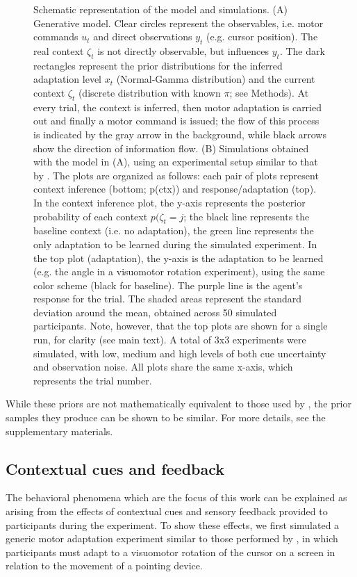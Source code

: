 \documentclass[a4paper,doc,floatsintext,natbib]{apa6}%
\begin{document}
\begin{figure}
\caption{Schematic representation of the model and simulations. (A) Generative model. Clear circles represent the observables, i.e. motor commands $u_t$ and direct observations $y_t$ (e.g. cursor position). The real context $\zeta_t$ is not directly observable, but influences $y_t$. The dark rectangles represent the prior distributions for the inferred adaptation level $x_t$ (Normal-Gamma distribution) and the current context $\zeta_t$ (discrete distribution with known $\pi$; see Methods). At every trial, the context is inferred, then motor adaptation is carried out and finally a motor command is issued; the flow of this process is indicated by the gray arrow in the background, while black arrows show the direction of information flow. (B) Simulations obtained with the model in (A), using an experimental setup similar to that by \cite{Davidson_Scaling_2004}. The plots are organized as follows: each pair of plots represent context inference (bottom; p(ctx)) and response/adaptation (top). In the context inference plot, the y-axis represents the posterior probability of each context $p(\zeta_t = j$; the black line represents the baseline context (i.e. no adaptation), the green line represents the only adaptation to be learned during the simulated experiment. In the top plot (adaptation), the y-axis is the adaptation to be learned (e.g. the angle in a visuomotor rotation experiment), using the same color scheme (black for baseline). The purple line is the agent's response for the trial. The shaded areas represent the standard deviation around the mean, obtained across 50 simulated participants. Note, however, that the top plots are shown for a single run, for clarity (see main text). A total of 3x3 experiments were simulated, with low, medium and high levels of both cue uncertainty and observation noise. All plots share the same x-axis, which represents the trial number.}
\label{fig:model}
\end{figure}
While these priors are not mathematically equivalent to those used by \cite{Heald_Contextual_2021}, the prior samples they produce can be shown to be similar. For more details, see the supplementary materials. 

\subsection{Contextual cues and feedback}
The behavioral phenomena which are the focus of this work can be explained as arising from the effects of contextual cues and sensory feedback provided to participants during the experiment. To show these effects, we first simulated a generic motor adaptation experiment similar to those performed by \cite{Davidson_Scaling_2004}, in which participants must adapt to a visuomotor rotation of the cursor on a screen in relation to the movement of a pointing device.
\end{document}
